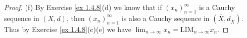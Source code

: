\begin{proof}{(f)}
    By Exercise \ref{ex 1.4.8}(d) we know that if \((x_n)_{n = 1}^\infty\) is a Cauchy sequence in \((X, d)\), then \((x_n)_{n = 1}^\infty\) is also a Cauchy sequence in \((\overline{X}, d_{\overline{X}})\).
    Thus by Exercise \ref{ex 1.4.8}(c)(e) we have \(\lim_{n \to \infty} x_n = \text{LIM}_{n \to \infty} x_n\).
\end{proof}